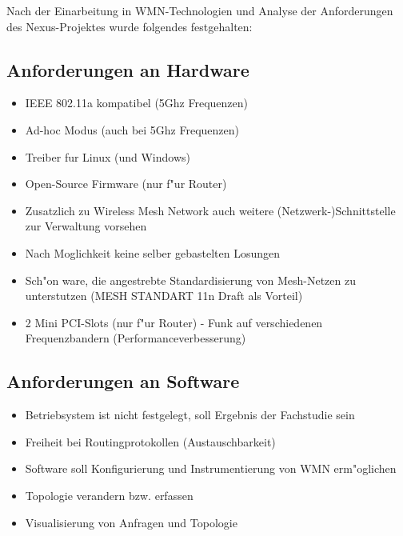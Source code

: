 Nach der Einarbeitung in WMN-Technologien und 
Analyse der Anforderungen des Nexus-Projektes
wurde folgendes festgehalten:

\subsection{Anforderungen an Hardware}
\begin{itemize}
	\item IEEE 802.11a kompatibel (5Ghz Frequenzen) 
	\item Ad-hoc Modus (auch bei 5Ghz Frequenzen) 
	\item Treiber fur Linux (und Windows) 
	\item Open-Source Firmware (nur f"ur Router) 
	\item Zusatzlich zu Wireless Mesh Network auch weitere (Netzwerk-)Schnittstelle zur Verwaltung vorsehen 
	\item Nach Moglichkeit keine selber gebastelten Losungen 
	\item Sch"on ware, die angestrebte Standardisierung von Mesh-Netzen zu unterstutzen 
				(MESH STANDART 11n Draft als Vorteil)
	\item 2 Mini PCI-Slots (nur f"ur Router) - 
				Funk auf verschiedenen Frequenzbandern (Performanceverbesserung) 
\end{itemize}

\subsection{Anforderungen an Software}
\begin{itemize}
	\item Betriebsystem ist nicht festgelegt, soll Ergebnis der Fachstudie sein
	\item Freiheit bei Routingprotokollen (Austauschbarkeit)
	\item Software soll Konfigurierung und Instrumentierung von WMN erm"oglichen
	\item Topologie verandern bzw. erfassen 
	\item Visualisierung von Anfragen und Topologie 
\end{itemize}

